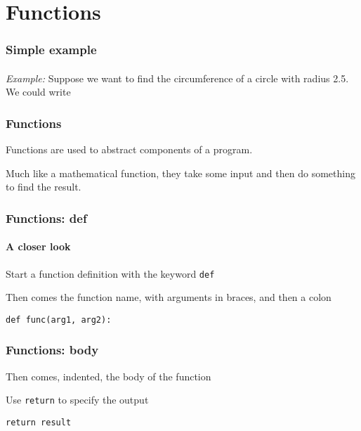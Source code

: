 \section{Functions} %
\label{sec:functions}

\begin{frame}\frametitle{Simple example}
    \framesubtitle{}

    \emph{Example:} Suppose we want to find the circumference of a circle with radius
    2.5. We could write


\end{frame}

\begin{frame}\frametitle{Functions}

    Functions are used to abstract components of a program.

    \vfill

    Much like a mathematical function, they take some input and then do something
    to find the result.

\end{frame}

\begin{frame}\frametitle{Functions: def}
    \framesubtitle{A closer look}

    Start a function definition with the keyword \texttt{def}

    \vfill

    Then comes the function name, with arguments in braces, and then a colon\pause

    \begin{center}
        \texttt{def func(arg1, arg2):}
    \end{center}

\end{frame}

\begin{frame}\frametitle{Functions: body}

    Then comes, indented, the body of the function

    \vfill\pause

    Use \texttt{return} to specify the output

    \begin{center}
        \texttt{return result}
    \end{center}


\end{frame}

